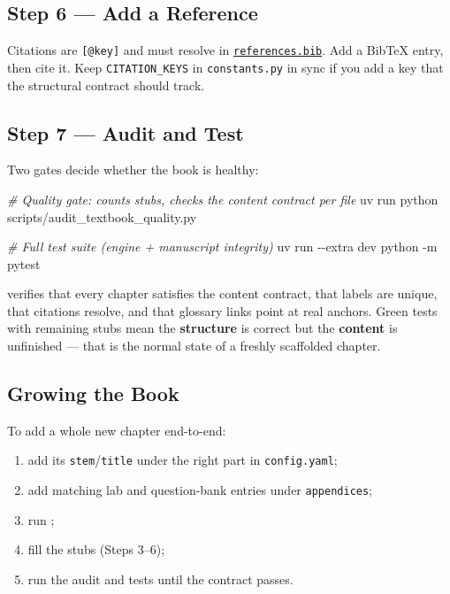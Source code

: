 \documentclass[
]{article}
\newenvironment{Shaded}{}{}
\newcommand{\AttributeTok}[1]{\textcolor[rgb]{0.49,0.56,0.16}{#1}}
\newcommand{\CommentTok}[1]{\textcolor[rgb]{0.38,0.63,0.69}{\textit{#1}}}
\newcommand{\ExtensionTok}[1]{#1}
\newcommand{\NormalTok}[1]{#1}
\providecommand{\tightlist}{%
  \setlength{\itemsep}{0pt}\setlength{\parskip}{0pt}}
\theoremstyle{plain}
\theoremstyle{definition}
\begin{document}
\subsection{Step 6 --- Add a Reference}\label{step-6-add-a-reference}

Citations are \texttt{{[}@key{]}} and must resolve in
\href{../references.bib}{\texttt{references.bib}}. Add a BibTeX entry,
then cite it. Keep \texttt{CITATION\_KEYS} in \texttt{constants.py} in
sync if you add a key that the structural contract should track.

\subsection{Step 7 --- Audit and Test}\label{step-7-audit-and-test}

Two gates decide whether the book is healthy:

\begin{Shaded}
\begin{Highlighting}[]
\CommentTok{\# Quality gate: counts stubs, checks the content contract per file}
\ExtensionTok{uv}\NormalTok{ run python scripts/audit\_textbook\_quality.py}

\CommentTok{\# Full test suite (engine + manuscript integrity)}
\ExtensionTok{uv}\NormalTok{ run }\AttributeTok{{-}{-}extra}\NormalTok{ dev python }\AttributeTok{{-}m}\NormalTok{ pytest}
\end{Highlighting}
\end{Shaded}

 verifies that every
chapter satisfies the content contract, that labels are unique, that
citations resolve, and that glossary links point at real anchors. Green
tests with remaining stubs mean the \textbf{structure} is correct but
the \textbf{content} is unfinished --- that is the normal state of a
freshly scaffolded chapter.

\subsection{Growing the Book}\label{growing-the-book}

To add a whole new chapter end-to-end:

\begin{enumerate}
\def\labelenumi{\arabic{enumi}.}
\tightlist
\item
  add its \texttt{stem}/\texttt{title} under the right part in
  \texttt{config.yaml};
\item
  add matching lab and question-bank entries under \texttt{appendices};
\item
  run ;
\item
  fill the stubs (Steps 3--6);
\item
  run the audit and tests until the contract passes.
\end{enumerate}
\end{document}
